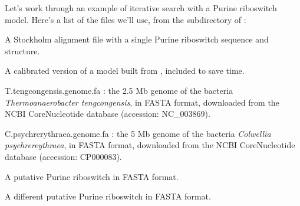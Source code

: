 

Let's work through an example of iterative search with a Purine
riboswitch model. Here's a list of the files we'll use, from the
 subdirectory of :



  \begin{sreitems}{}
  \item[\prog{purine.1.sto}] A Stockholm alignment file with a single
       Purine riboswitch sequence and structure. 
  \item[\prog{purine.1.c.cm}] A calibrated version of a model built
    from , included to save time.
  \item[{T.tengcongensis.genome.fa}]: the 2.5 Mb genome of the bacteria
    \emph{Thermoanaerobacter tengcongensis}, in
    FASTA format, downloaded from the NCBI CoreNucleotide database
    (accession: NC\_003869). 
  \item[{C.psychrerythraea.genome.fa}]: the 5 Mb genome of the bacteria
    \emph{Colwellia psychrereythraea}, in
    FASTA format, downloaded from the NCBI CoreNucleotide database
    (accession: CP000083). 
  \item[\prog{purine.thermo.fa}] A putative Purine riboswitch in FASTA format.
  \item[\prog{purine.psych.fa}] A different putative Purine riboswitch in FASTA format.
  \end{sreitems}

